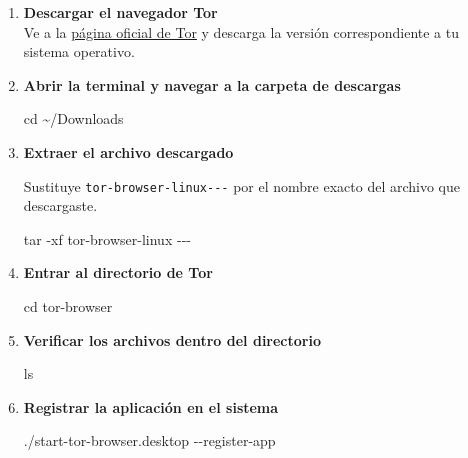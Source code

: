 \documentclass[
  jou,
  floatsintext,
  longtable,
  a4paper,
  nolmodern,
  notxfonts,
  notimes,
  12pt,
  colorlinks=true,linkcolor=blue,citecolor=blue,urlcolor=blue]{apa7}
\newenvironment{Shaded}{\begin{snugshade}}{\end{snugshade}}
\newcommand{\AttributeTok}[1]{\textcolor[rgb]{0.40,0.45,0.13}{#1}}
\newcommand{\BuiltInTok}[1]{\textcolor[rgb]{0.00,0.23,0.31}{#1}}
\newcommand{\ExtensionTok}[1]{\textcolor[rgb]{0.00,0.23,0.31}{#1}}
\newcommand{\FunctionTok}[1]{\textcolor[rgb]{0.28,0.35,0.67}{#1}}
\newcommand{\NormalTok}[1]{\textcolor[rgb]{0.00,0.23,0.31}{#1}}
\begin{document}
\begin{enumerate}
\def\labelenumi{\arabic{enumi}.}
\item
  \textbf{Descargar el navegador Tor}\\
  Ve a la \href{https://www.torproject.org/}{página oficial de Tor} y
  descarga la versión correspondiente a tu sistema operativo.
\item
  \textbf{Abrir la terminal y navegar a la carpeta de descargas}

\begin{Shaded}
\begin{Highlighting}[]
\BuiltInTok{cd}\NormalTok{ \textasciitilde{}/Downloads}
\end{Highlighting}
\end{Shaded}
\item
  \textbf{Extraer el archivo descargado}

  Sustituye \texttt{tor-browser-linux-\/-\/-} por el nombre exacto del
  archivo que descargaste.

\begin{Shaded}
\begin{Highlighting}[]
\FunctionTok{tar} \AttributeTok{{-}xf}\NormalTok{ tor{-}browser{-}linux}
\ExtensionTok{{-}{-}{-}}
\end{Highlighting}
\end{Shaded}
\item
  \textbf{Entrar al directorio de Tor}

\begin{Shaded}
\begin{Highlighting}[]
\BuiltInTok{cd}\NormalTok{ tor{-}browser}
\end{Highlighting}
\end{Shaded}
\item
  \textbf{Verificar los archivos dentro del directorio}

\begin{Shaded}
\begin{Highlighting}[]
\FunctionTok{ls}
\end{Highlighting}
\end{Shaded}
\item
  \textbf{Registrar la aplicación en el sistema}

\begin{Shaded}
\begin{Highlighting}[]
\ExtensionTok{./start{-}tor{-}browser.desktop} \AttributeTok{{-}{-}register{-}app}
\end{Highlighting}
\end{Shaded}
\end{enumerate}
\end{document}
